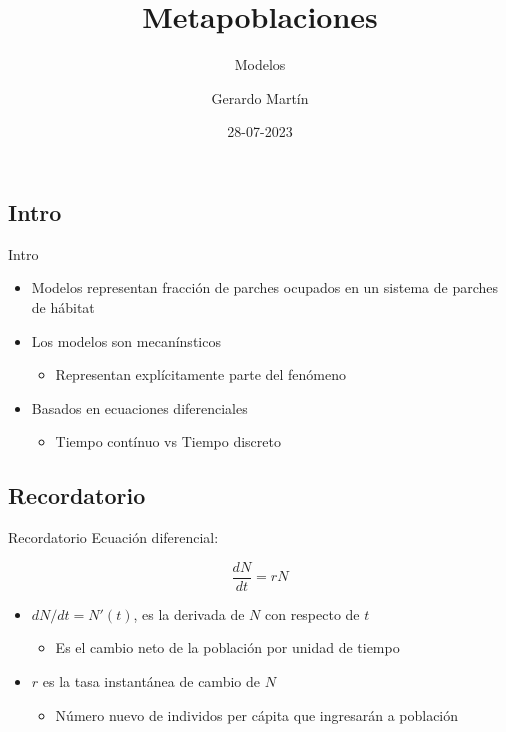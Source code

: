 \documentclass[
  11pt,
  ignorenonframetext,
]{beamer}
\title{Metapoblaciones}
\subtitle{Modelos}
\author{Gerardo Martín}
\date{28-07-2023}
\providecommand{\tightlist}{%
  \setlength{\itemsep}{0pt}\setlength{\parskip}{0pt}}
\begin{document}
\frame{\titlepage}

\subsection{Intro}\label{intro}

\begin{frame}{Intro}
\begin{itemize}
\item
  Modelos representan fracción de parches ocupados en un sistema de
  parches de hábitat
\item
  Los modelos son mecanínsticos

  \begin{itemize}
  \tightlist
  \item
    Representan explícitamente parte del fenómeno
  \end{itemize}
\item
  Basados en ecuaciones diferenciales

  \begin{itemize}
  \tightlist
  \item
    Tiempo contínuo vs Tiempo discreto
  \end{itemize}
\end{itemize}
\end{frame}

\subsection{Recordatorio}\label{recordatorio}

\begin{frame}{Recordatorio}
Ecuación diferencial:

\[\frac{dN}{dt} = r N\]

\begin{itemize}
\item
  \(dN/dt = N'(t)\), es la derivada de \(N\) con respecto de \(t\)

  \begin{itemize}
  \tightlist
  \item
    Es el cambio neto de la población por unidad de tiempo
  \end{itemize}
\item
  \(r\) es la tasa instantánea de cambio de \(N\)

  \begin{itemize}
  \tightlist
  \item
    Número nuevo de individos per cápita que ingresarán a población
  \end{itemize}
\end{itemize}
\end{frame}
\end{document}

